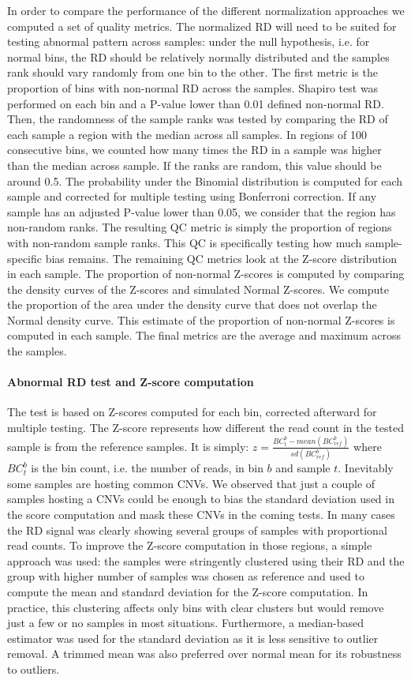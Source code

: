 In order to compare the performance of the different normalization approaches we computed a set of quality metrics. The normalized RD will need to be suited for testing abnormal pattern across samples: under the null hypothesis, i.e. for normal bins, the RD should be relatively normally distributed and the samples rank should vary randomly from one bin to the other. The first metric is the proportion of bins with non-normal RD across the samples. Shapiro test was performed on each bin and a P-value lower than 0.01 defined non-normal RD. Then, the randomness of the sample ranks was tested by comparing the RD of each sample a region with the median across all samples. In regions of 100 consecutive bins, we counted how many times the RD in a sample was higher than the median across sample. If the ranks are random, this value should be around 0.5. The probability under the Binomial distribution is computed for each sample and corrected for multiple testing using Bonferroni correction. If any sample has an adjusted P-value lower than 0.05, we consider that the region has non-random ranks. The resulting QC metric is simply the proportion of regions with non-random sample ranks. This QC is specifically testing how much sample-specific bias remains. The remaining QC metrics look at the Z-score distribution in each sample. The proportion of non-normal Z-scores is computed by comparing the density curves of the Z-scores and simulated Normal Z-scores. We compute the proportion of the area under the density curve that does not overlap the Normal density curve. This estimate of the proportion of non-normal Z-scores is computed in each sample. The final metrics are the average and maximum across the samples.

\paragraph{Abnormal RD test and Z-score computation}
The test is based on Z-scores computed for each bin, corrected afterward for multiple testing. The Z-score represents how different the read count in the tested sample is from the reference samples. It is simply: $z=\frac{BC_t^b-mean(BC_{ref}^b)}{sd(BC_{ref}^b)}$ where $BC_t^b$ is the bin count, i.e. the number of reads, in bin $b$ and sample $t$.
Inevitably some samples are hosting common CNVs. We observed that just a couple of samples hosting a CNVs could be enough to bias the standard deviation used in the score computation and mask these CNVs in the coming tests. In many cases the RD signal was clearly showing several groups of samples with proportional read counts. To improve the Z-score computation in those regions, a simple approach was used: the samples were stringently clustered using their RD and the group with higher number of samples was chosen as reference and used to compute the mean and standard deviation for the Z-score computation. In practice, this clustering affects only bins with clear clusters but would remove just a few or no samples in most situations. Furthermore, a median-based estimator was used for the standard deviation as it is less sensitive to outlier removal. A trimmed mean was also preferred over normal mean for its robustness to outliers.

